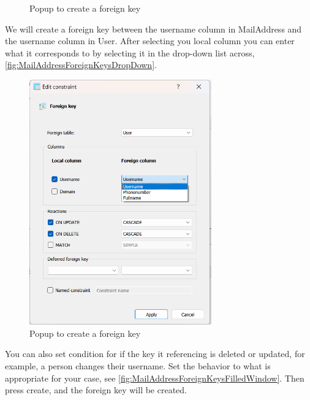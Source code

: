 \documentclass[a4paper,11pt,oneside]{article}
\begin{document}
\begin{sloppypar}
\begin{figure}[!htb]
  \caption{Popup to create a foreign key}
  \label{fig:MailAddressForeignKeysBlankWindow}
\end{figure}
We will create a foreign key between the username column in MailAddress and the username column in User. After selecting you local column you can enter what it corresponds to by selecting it in the drop-down list across, \autoref{fig:MailAddressForeignKeysDropDown}. 
\begin{figure}[!htb]
  \centering
  \includegraphics[width=0.7\textwidth]{sqlitestudio/create_foreign_key/foreign_key_dropdown_menu.png}
  \caption{Popup to create a foreign key}
  \label{fig:MailAddressForeignKeysDropDown}
\end{figure}
You can also set condition for if the key it referencing is deleted or updated, for example, a person changes their username. Set the behavior to what is appropriate for your case, see \autoref{fig:MailAddressForeignKeysFilledWindow}. Then press create, and the foreign key will be created.
\begin{figure}[!htb]
  \centering

\end{figure}
\end{sloppypar}
\end{document}
